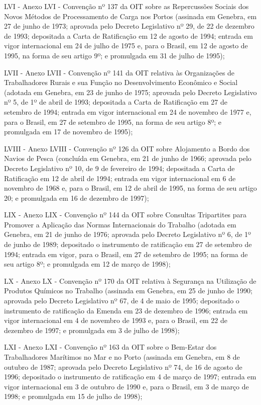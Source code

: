 \documentclass[
]{book}
\begin{document}
LVI - Anexo LVI - Convenção nº 137 da OIT sobre as Repercussões Sociais dos Novos Métodos de Processamento de Carga nos Portos (assinada em Genebra, em 27 de junho de 1973; aprovada pelo Decreto Legislativo nº 29, de 22 de dezembro de 1993; depositada a Carta de Ratificação em 12 de agosto de 1994; entrada em vigor internacional em 24 de julho de 1975 e, para o Brasil, em 12 de agosto de 1995, na forma de seu artigo 9º; e promulgada em 31 de julho de 1995);

LVII - Anexo LVII - Convenção nº 141 da OIT relativa às Organizações de Trabalhadores Rurais e sua Função no Desenvolvimento Econômico e Social (adotada em Genebra, em 23 de junho de 1975; aprovada pelo Decreto Legislativo nº 5, de 1º de abril de 1993; depositada a Carta de Ratificação em 27 de setembro de 1994; entrada em vigor internacional em 24 de novembro de 1977 e, para o Brasil, em 27 de setembro de 1995, na forma de seu artigo 8º; e promulgada em 17 de novembro de 1995);

LVIII - Anexo LVIII - Convenção nº 126 da OIT sobre Alojamento a Bordo dos Navios de Pesca (concluída em Genebra, em 21 de junho de 1966; aprovada pelo Decreto Legislativo nº 10, de 9 de fevereiro de 1994; depositada a Carta de Ratificação em 12 de abril de 1994; entrada em vigor internacional em 6 de novembro de 1968 e, para o Brasil, em 12 de abril de 1995, na forma de seu artigo 20; e promulgada em 16 de dezembro de 1997);

LIX - Anexo LIX - Convenção nº 144 da OIT sobre Consultas Tripartites para Promover a Aplicação das Normas Internacionais do Trabalho (adotada em Genebra, em 21 de junho de 1976; aprovada pelo Decreto Legislativo nº 6, de 1º de junho de 1989; depositado o instrumento de ratificação em 27 de setembro de 1994; entrada em vigor, para o Brasil, em 27 de setembro de 1995; na forma de seu artigo 8º; e promulgada em 12 de março de 1998);

LX - Anexo LX - Convenção nº 170 da OIT relativa à Segurança na Utilização de Produtos Químicos no Trabalho (assinada em Genebra, em 25 de junho de 1990; aprovada pelo Decreto Legislativo nº 67, de 4 de maio de 1995; depositado o instrumento de ratificação da Emenda em 23 de dezembro de 1996; entrada em vigor internacional em 4 de novembro de 1993 e, para o Brasil, em 22 de dezembro de 1997; e promulgada em 3 de julho de 1998);

LXI - Anexo LXI - Convenção nº 163 da OIT sobre o Bem-Estar dos Trabalhadores Marítimos no Mar e no Porto (assinada em Genebra, em 8 de outubro de 1987; aprovada pelo Decreto Legislativo nº 74, de 16 de agosto de 1996; depositado o instrumento de ratificação em 4 de março de 1997; entrada em vigor internacional em 3 de outubro de 1990 e, para o Brasil, em 3 de março de 1998; e promulgada em 15 de julho de 1998);
\end{document}
